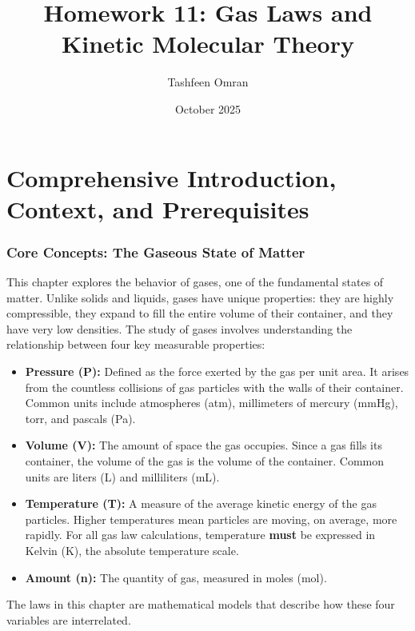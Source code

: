 \documentclass{article}
\title{Homework 11: Gas Laws and Kinetic Molecular Theory}
\author{Tashfeen Omran}
\date{October 2025}
\begin{document}
\maketitle

\part{Comprehensive Introduction, Context, and Prerequisites}

\section{Core Concepts: The Gaseous State of Matter}
This chapter explores the behavior of gases, one of the fundamental states of matter. Unlike solids and liquids, gases have unique properties: they are highly compressible, they expand to fill the entire volume of their container, and they have very low densities. The study of gases involves understanding the relationship between four key measurable properties:
\begin{itemize}
    \item \textbf{Pressure (P):} Defined as the force exerted by the gas per unit area. It arises from the countless collisions of gas particles with the walls of their container. Common units include atmospheres (atm), millimeters of mercury (mmHg), torr, and pascals (Pa).
    \item \textbf{Volume (V):} The amount of space the gas occupies. Since a gas fills its container, the volume of the gas is the volume of the container. Common units are liters (L) and milliliters (mL).
    \item \textbf{Temperature (T):} A measure of the average kinetic energy of the gas particles. Higher temperatures mean particles are moving, on average, more rapidly. For all gas law calculations, temperature \textbf{must} be expressed in Kelvin (K), the absolute temperature scale.
    \item \textbf{Amount (n):} The quantity of gas, measured in moles (mol).
\end{itemize}
The laws in this chapter are mathematical models that describe how these four variables are interrelated.
\end{document}
